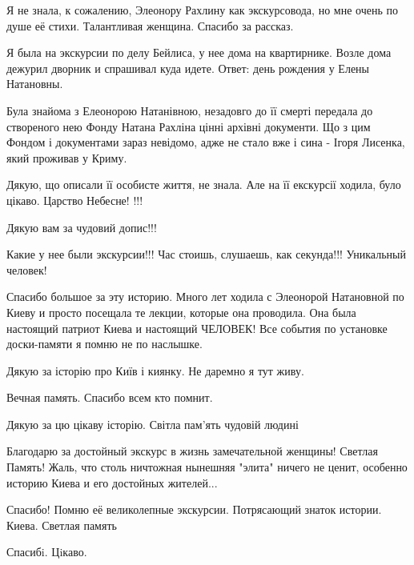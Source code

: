 \begin{itemize}
\begin{itemize}
\end{itemize} %


Я не знала, к сожалению, Элеонору Рахлину как экскурсовода, но мне очень по
душе её стихи. Талантливая женщина. Спасибо за рассказ.


Я была на экскурсии по делу Бейлиса, у нее дома на квартирнике. Возле дома
дежурил дворник и спрашивал куда идете. Ответ: день рождения у Елены Натановны.


Була знайома з Елеонорою Натанівною, незадовго до її смерті передала до
створеного нею Фонду Натана Рахліна цінні архівні документи. Що з цим Фондом і
документами зараз невідомо, адже не стало вже і сина - Ігоря Лисенка, який
проживав у Криму.

Дякую, що описали її особисте життя, не знала.
Але на її екскурсії ходила, було цікаво.
Царство Небесне! !!!

Дякую вам за чудовий допис!!!

Какие у нее были экскурсии!!! Час стоишь, слушаешь, как секунда!!! Уникальный человек!


Спасибо большое за эту историю. Много лет ходила с Элеонорой Натановной по
Киеву и просто посещала те лекции, которые она проводила. Она была настоящий
патриот Киева и настоящий ЧЕЛОВЕК! Все события по установке доски-памяти я
помню не по наслышке.

Дякую за історію про Київ і киянку. Не даремно я тут живу.

Вечная память. Спасибо всем кто помнит.

Дякую за цю цікаву історію. Світла пам'ять чудовій людині


Благодарю за достойный экскурс в жизнь замечательной женщины! Светлая Память!
Жаль, что столь ничтожная нынешняя "элита" ничего не ценит, особенно историю
Киева и его достойных жителей...


Спасибо! Помню её великолепные экскурсии. Потрясающий знаток истории. Киева.
Светлая память

Спасибi. Цiкаво.


\end{itemize}
